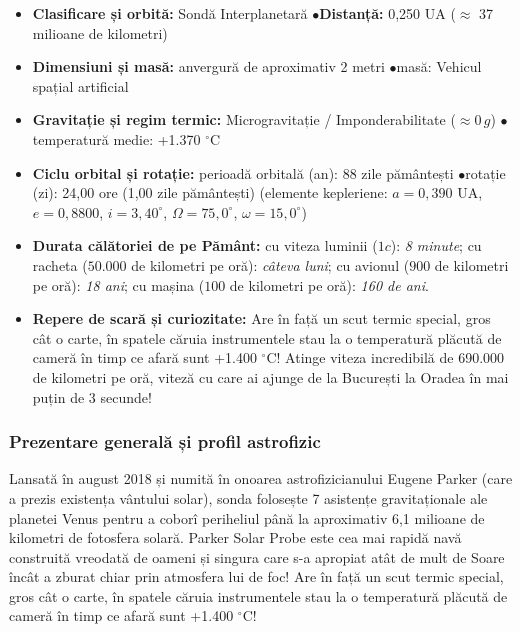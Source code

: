 \begin{tcolorbox}[orbitardata, title={\textbf{Repere esențiale: Parker Solar Probe}}]
\small
\begin{itemize}[leftmargin=1.4em, itemsep=2pt, topsep=2pt]
  \item \textbf{Clasificare și orbită:} Sondă Interplanetară \quad$\bullet$\quad \textbf{Distanță:} 0,250 UA ($\approx$ 37 milioane de kilometri)
  \item \textbf{Dimensiuni și masă:} anvergură de aproximativ 2 metri \quad$\bullet$\quad masă: Vehicul spațial artificial
  \item \textbf{Gravitație și regim termic:} Microgravitație / Imponderabilitate ($\approx 0\,g$) \quad$\bullet$\quad temperatură medie: +1.370 $^\circ$C
  \item \textbf{Ciclu orbital și rotație:} perioadă orbitală (an): 88 zile pământești \quad$\bullet$\quad rotație (zi): 24,00 ore (1,00 zile pământești) (elemente kepleriene: $a = 0,390$ UA, $e = 0,8800$, $i = 3,40^\circ$, $\Omega = 75,0^\circ$, $\omega = 15,0^\circ$)
  \item \textbf{Durata călătoriei de pe Pământ:} cu viteza luminii ($1c$): \emph{8 minute}; cu racheta ($50.000$ de kilometri pe oră): \emph{câteva luni}; cu avionul ($900$ de kilometri pe oră): \emph{18 ani}; cu mașina ($100$ de kilometri pe oră): \emph{160 de ani}.
  \item \textbf{Repere de scară și curiozitate:} Are în față un scut termic special, gros cât o carte, în spatele căruia instrumentele stau la o temperatură plăcută de cameră în timp ce afară sunt +1.400 $^\circ$C! Atinge viteza incredibilă de 690.000 de kilometri pe oră, viteză cu care ai ajunge de la București la Oradea în mai puțin de 3 secunde!
\end{itemize}
\end{tcolorbox}

\subsubsection*{Prezentare generală și profil astrofizic}
Lansată în august 2018 și numită în onoarea astrofizicianului Eugene Parker (care a prezis existența vântului solar), sonda folosește 7 asistențe gravitaționale ale planetei Venus pentru a coborî periheliul până la aproximativ 6,1 milioane de kilometri de fotosfera solară. Parker Solar Probe este cea mai rapidă navă construită vreodată de oameni și singura care s-a apropiat atât de mult de Soare încât a zburat chiar prin atmosfera lui de foc! Are în față un scut termic special, gros cât o carte, în spatele căruia instrumentele stau la o temperatură plăcută de cameră în timp ce afară sunt +1.400 $^\circ$C!

